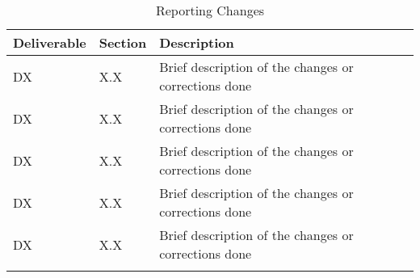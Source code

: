 \begin{longtable}[H]{l l p{10.3cm}}
	
	\toprule[2pt]
	
	\textbf{Deliverable} & \textbf{Section} & \textbf{Description} \\
	
	\midrule[1.5pt] 
	\endhead
	
	DX & X.X & Brief description of the changes or corrections done \vspace{0.2cm} \\
	
	\midrule

	DX & X.X & Brief description of the changes or corrections done \vspace{0.2cm} \\
	
	\midrule

	DX & X.X & Brief description of the changes or corrections done \vspace{0.2cm} \\
	
	\midrule

	DX & X.X & Brief description of the changes or corrections done \vspace{0.2cm} \\
	
	\midrule
		
	DX & X.X & Brief description of the changes or corrections done \vspace{0.2cm} \\
	
	\bottomrule[2pt]
	
	\caption{Reporting Changes}
\end{longtable}

